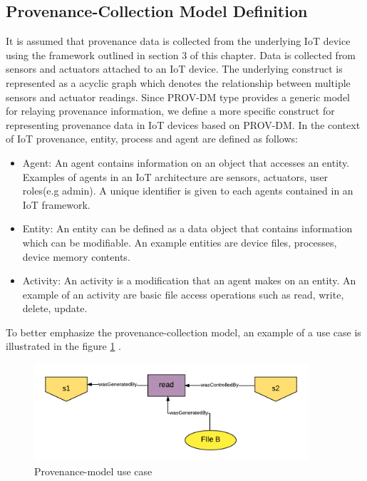\subsection{Provenance-Collection Model Definition}

It is assumed that provenance data is collected from the underlying IoT device using the framework outlined in section 3 of this chapter. Data is collected from sensors and actuators attached to an IoT device. The underlying construct is represented as a acyclic graph which denotes the relationship between multiple sensors and actuator readings. Since PROV-DM type provides a generic model for relaying provenance information, we define a more specific construct for representing provenance data in IoT devices based on  PROV-DM. In the context of IoT provenance, entity, process and agent are defined as follows:

\begin{itemize}

\item Agent: An agent contains information on an object that accesses an entity. Examples of agents in an IoT architecture are sensors, actuators, user roles(e.g admin). A unique identifier is given to each agents contained in an IoT framework.

\item Entity:  An entity can be defined as a data object that contains information which can be modifiable. An example entities are device files, processes, device memory contents.

\item Activity: An activity is a modification that an agent makes on an entity. An example of an activity are basic file access operations such as read, write, delete, update. 


\end{itemize}


To better emphasize the provenance-collection model, an example of a use case is illustrated in the figure \ref{prov_model} .



\begin{figure}[h]
\begin{center}

\includegraphics[width=4.0in]{provenance_model.png}    
\end{center}
\caption{Provenance-model use case}
\label{prov_model}
\end{figure}




